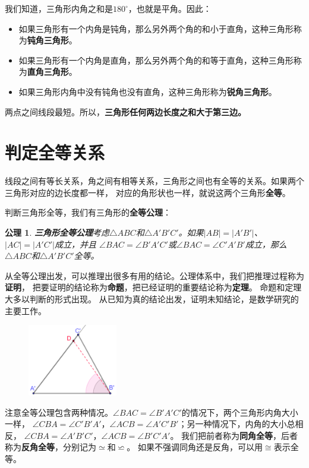 \documentclass[12pt,UTF8]{ctexbook}
\newtheorem{po}{公理}
\begin{document}
我们知道，三角形内角之和是$180^\circ$，也就是平角。因此：
\begin{itemize}
    \item 如果三角形有一个内角是钝角，那么另外两个角的和小于直角，这种三角形称为\textbf{钝角三角形}。
    \item 如果三角形有一个内角是直角，那么另外两个角的和等于直角，这种三角形称为\textbf{直角三角形}。
    \item 如果三角形内角中没有钝角也没有直角，这种三角形称为\textbf{锐角三角形}。
\end{itemize}

两点之间线段最短。所以，\textbf{三角形任何两边长度之和大于第三边。}

\section{判定全等关系}
线段之间有等长关系，角之间有相等关系，三角形之间也有全等的关系。如果两个三角形对应的边长度都一样，
对应的角形状也一样，就说这两个三角形\textbf{全等}。

判断三角形全等，我们有三角形的\textbf{全等公理}：
\begin{po}{\textbf{三角形全等公理}}\label{po:7}
    考虑$\triangle ABC$和$\triangle A'B'C'$。如果$|AB| = |A'B'|$、$|AC| = |A'C'|$成立，并且
$\angle BAC = \angle B'A'C'$或$\angle BAC = \angle C'A'B'$成立，那么$\triangle ABC$和$\triangle A'B'C'$全等。
\end{po}

从全等公理出发，可以推理出很多有用的结论。公理体系中，我们把推理过程称为\textbf{证明}，
把要证明的结论称为\textbf{命题}，把已经证明的重要结论称为\textbf{定理}。
命题和定理大多以判断的形式出现。
从已知为真的结论出发，证明未知结论，是数学研究的主要工作。

\begin{figure} %
    \vspace{-15pt}
    \centering
    \includegraphics[width=0.35\textwidth]{三角形3.png}
\end{figure}

注意全等公理包含两种情况。$\angle BAC = \angle B'A'C'$的情况下，两个三角形内角大小一样，
$\angle CBA = \angle C'B'A'$，$\angle ACB = \angle A'C'B'$；另一种情况下，内角的大小总相反，
$\angle CBA = \angle A'B'C'$，$\angle ACB = \angle B'C'A'$。
我们把前者称为\textbf{同角全等}，后者称为\textbf{反角全等}，分别记为$\simeq$和$\backsimeq$。
如果不强调同角还是反角，可以用$\cong$表示全等。
\end{document}
